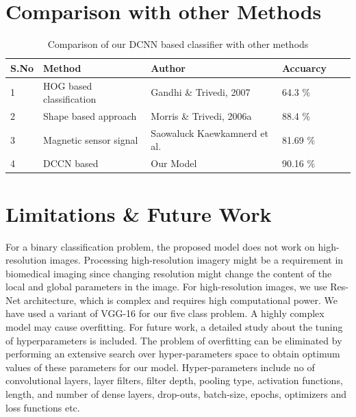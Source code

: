 \section{Comparison with other Methods}
\begin{table}[H]
    \caption{Comparison of our DCNN based classifier with other methods}
    \label{table:4.3}
      \begin{center}
        \scalebox{1.05}
        {\begin{tabular}{|l |l |l |l |l |l |}
        \hline
        S.No & Method & Author & Accuarcy \\ \hline
        1  & HOG based classification & Gandhi \& Trivedi, 2007 & 64.3 \%
        \\ \hline
        2  & Shape based approach & Morris \& Trivedi, 2006a & 88.4 \% 
        \\ \hline %
        3   & Magnetic sensor signal &  Saowaluck Kaewkamnerd et al. & 81.69 \% 
        \\ \hline %
        4   & DCCN based  & Our Model & 90.16 \%
        \\ \hline %
        \end{tabular}}
      \end{center}
\end{table}

\section{Limitations \& Future Work}

For a binary classification problem, the proposed model does not work on high-resolution images.
Processing high-resolution imagery might be a requirement in biomedical imaging
since changing resolution might change the content of the
local and global parameters in the image. For high-resolution images, we use Res-Net architecture, which is complex and
requires high computational power. We have used a variant of VGG-16 for
our five class problem. A highly complex model may cause overfitting.
For future work, a detailed study
about the tuning of hyperparameters is included.
The problem of overfitting can be eliminated by performing an
extensive search over hyper-parameters space to obtain optimum 
values of these parameters for our model.
Hyper-parameters include no of convolutional layers, layer filters,
filter depth, pooling type, activation functions, length, and number
of dense layers, drop-outs, batch-size, epochs, optimizers and loss
functions etc.
